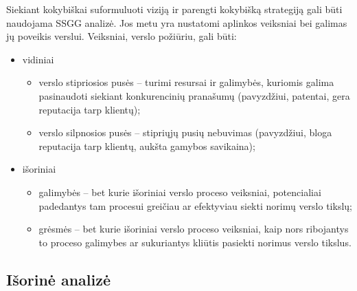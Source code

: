 Siekiant kokybiškai suformuluoti viziją ir parengti kokybišką strategiją
gali būti naudojama SSGG  analizė. Jos metu yra 
nustatomi aplinkos veiksniai bei galimas jų poveikis verslui. Veiksniai, 
verslo požiūriu, gali būti:
\begin{itemize}
  \item vidiniai
    \begin{itemize}
      \item verslo stipriosios pusės  – turimi resursai
        ir galimybės, kuriomis galima pasinaudoti siekiant konkurencinių
        pranašumų (pavyzdžiui, patentai, gera reputacija tarp klientų);
      \item verslo silpnosios pusės  – stipriųjų pusių
        nebuvimas (pavyzdžiui, bloga reputacija tarp klientų, aukšta
        gamybos savikaina);
    \end{itemize}
  \item išoriniai
    \begin{itemize}
      \item galimybės  – bet kurie išoriniai verslo
        proceso veiksniai, potencialiai padedantys tam procesui
        greičiau ar efektyviau siekti norimų verslo tikslų;
      \item grėsmės  – bet kurie išoriniai verslo proceso
        veiksniai, kaip nors ribojantys to proceso galimybes ar 
        sukuriantys kliūtis pasiekti norimus verslo tikslus.
    \end{itemize}
\end{itemize}


\subsection{Išorinė analizė}

